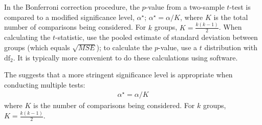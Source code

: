 In the Bonferroni correction procedure, the $p$-value from a two-sample $t$-test is compared to a modified significance level, $\alpha^\star$; $\alpha^\star = \alpha/K$, where $K$ is the total number of comparisons being considered. For $k$ groups, $K=\frac{k(k-1)}{2}$. When calculating the $t$-statistic, use the pooled estimate of standard deviation between groups (which equals $\sqrt{MSE}$); to calculate the $p$-value, use a $t$ distribution with $\textrm{df}_2$. It is typically more convenient to do these calculations using software. 

\begin{termBox}{
		The  suggests that a more stringent significance level is appropriate when conducting multiple tests:
		\begin{align*}
		\alpha^\star = \alpha / K
		\end{align*}
		where $K$ is the number of comparisons being considered. For $k$ groups, $K=\frac{k(k-1)}{2}$.}
\end{termBox}

